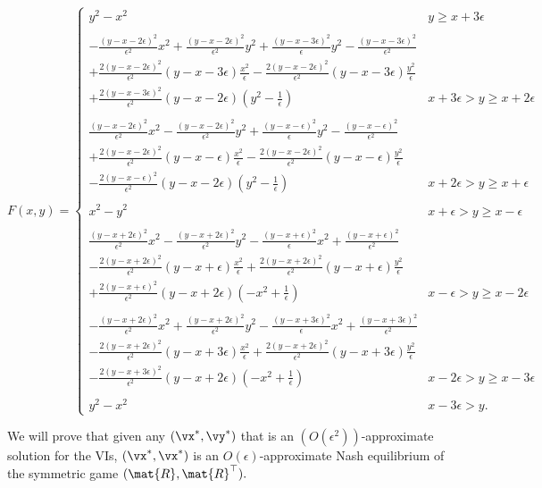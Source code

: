 \[F(x,y) = \begin{cases} 
      y^2-x^2& y \geq x + 3\epsilon \\ \\
      -\frac{(y-x-2\epsilon)^2}{\epsilon^2} x^2 + \frac{(y-x-2\epsilon)^2}{\epsilon^2} y^2 + \frac{(y-x-3\epsilon)^2}{\epsilon} y^2 - \frac{(y-x-3\epsilon)^2}{\epsilon^2}\\
      +  \frac{2(y-x-2\epsilon)^2}{\epsilon^2} (y - x - 3\epsilon) \frac{x^2}{\epsilon} -  \frac{2(y-x-2\epsilon)^2}{\epsilon^2} (y - x - 3\epsilon) \frac{y^2}{\epsilon} \\
      + \frac{2(y-x-3\epsilon)^2}{\epsilon^2}(y - x- 2\epsilon)(y^2 -\frac{1}{\epsilon})
       & x+3\epsilon>y \geq  x+2\epsilon \\ \\
       \frac{(y-x-2\epsilon)^2}{\epsilon^2} x^2 - \frac{(y-x-2\epsilon)^2}{\epsilon^2} y^2 + \frac{(y-x-\epsilon)^2}{\epsilon} y^2 - \frac{(y-x-\epsilon)^2}{\epsilon^2}\\
       +\frac{2(y-x-2\epsilon)^2}{\epsilon^2} (y - x - \epsilon) \frac{x^2}{\epsilon} - \frac{2(y-x-2\epsilon)^2}{\epsilon^2} (y - x - \epsilon) \frac{y^2}{\epsilon} \\ - \frac{2(y-x-\epsilon)^2}{\epsilon^2}(y - x- 2\epsilon)(y^2 -\frac{1}{\epsilon}) & x+2\epsilon > y \geq x+\epsilon\\ \\
      x^2-y^2 & x+\epsilon > y \geq x-\epsilon\\ \\
      \frac{(y-x+2\epsilon)^2}{\epsilon^2} x^2 - \frac{(y-x+2\epsilon)^2}{\epsilon^2} y^2 - \frac{(y-x+\epsilon)^2}{\epsilon} x^2 + \frac{(y-x+\epsilon)^2}{\epsilon^2}\\
       -\frac{2(y-x+2\epsilon)^2}{\epsilon^2} (y - x + \epsilon) \frac{x^2}{\epsilon} + \frac{2(y-x+2\epsilon)^2}{\epsilon^2} (y - x + \epsilon) \frac{y^2}{\epsilon} \\ + \frac{2(y-x+\epsilon)^2}{\epsilon^2}(y - x+ 2\epsilon)(-x^2 +\frac{1}{\epsilon})  & x-\epsilon > y \geq x-2\epsilon\\ \\
      -\frac{(y-x+2\epsilon)^2}{\epsilon^2} x^2 + \frac{(y-x+2\epsilon)^2}{\epsilon^2} y^2 - \frac{(y-x+3\epsilon)^2}{\epsilon} x^2 + \frac{(y-x+3\epsilon)^2}{\epsilon^2}\\
      -  \frac{2(y-x+2\epsilon)^2}{\epsilon^2} (y - x + 3\epsilon) \frac{x^2}{\epsilon} +  \frac{2(y-x+2\epsilon)^2}{\epsilon^2} (y - x + 3\epsilon) \frac{y^2}{\epsilon} \\
      -\frac{2(y-x+3\epsilon)^2}{\epsilon^2}(y - x+ 2\epsilon)(-x^2 +\frac{1}{\epsilon})& x-2\epsilon > y \geq x-3\epsilon\\ \\
      y^2-x^2 & x-3\epsilon > y. 
   \end{cases}
\]

We will prove that given any $(\vx^*,\vy^*)$ that is an $(O(\epsilon^2))$-approximate solution for the VIs, $(\vx^*,\vx^*)$ is an $O(\epsilon)$-approximate Nash equilibrium of the symmetric game $(\mat{R},\mat{R}^{\top}).$ 
